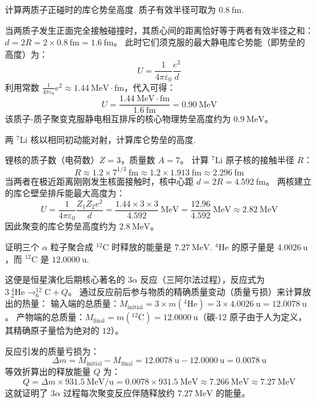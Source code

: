 \begin{exercise}\label{ex:29.32}
计算两质子正碰时的库仑势垒高度. 质子有效半径可取为 $0.8 \ \mathrm{fm}$.
\end{exercise}
\begin{solution}
当两质子发生正面完全接触碰撞时，其质心间的距离恰好等于两者有效半径之和：$d = 2 R = 2 \times 0.8 \ \mathrm{fm} = 1.6 \ \mathrm{fm}$。
此时它们须克服的最大静电库仑势能（即势垒的高度）为：
$$ U = \frac{1}{4\pi\varepsilon_0} \frac{e^2}{d} $$
利用常数 $\frac{1}{4\pi\varepsilon_0} e^2 \approx 1.44 \ \mathrm{MeV \cdot fm}$，代入可得：
$$ U = \frac{1.44 \ \mathrm{MeV \cdot fm}}{1.6 \ \mathrm{fm}} = 0.90 \ \mathrm{MeV} $$
该质子-质子聚变克服静电相互排斥的核心物理势垒高度约为 $0.9 \ \mathrm{MeV}$。
\end{solution}

\begin{exercise}\label{ex:29.33}
两 $^7\mathrm{Li}$ 核以相同初动能对射，计算库仑势垒的高度.
\end{exercise}
\begin{solution}
锂核的质子数（电荷数）$Z = 3$，质量数 $A = 7$。
计算 $^7\mathrm{Li}$ 原子核的接触半径 $R$：
$$ R \approx 1.2 \times 7^{1/3} \ \mathrm{fm} \approx 1.2 \times 1.913 \ \mathrm{fm} \approx 2.296 \ \mathrm{fm} $$
当两者在极近距离刚刚发生核面接触时，核中心距 $d = 2R = 4.592 \ \mathrm{fm}$。
两核建立的库仑壁垒排斥能最大高度为：
$$ U = \frac{1}{4\pi\varepsilon_0} \frac{Z_1 Z_2 e^2}{d} = \frac{1.44 \times 3 \times 3}{4.592} \ \mathrm{MeV} = \frac{12.96}{4.592} \ \mathrm{MeV} \approx 2.82 \ \mathrm{MeV} $$
因此聚变的库仑势垒高度约为 $2.8 \ \mathrm{MeV}$。
\end{solution}

\begin{exercise}\label{ex:29.34}
证明三个 $\alpha$ 粒子聚合成 $^{12}\mathrm{C}$ 时释放的能量是 $7.27 \ \mathrm{MeV}$. $^4\mathrm{He}$ 的原子量是 $4.0026 \ \mathrm{u}$，而 $^{12}\mathrm{C}$ 是 $12.0000 \ \mathrm{u}$.
\end{exercise}
\begin{solution}
这便是恒星演化后期核心著名的 3$\alpha$ 反应（三阿尔法过程），反应式为 $3 \ ^4_2\mathrm{He} \rightarrow ^{12}_6\mathrm{C} + Q$。
通过反应前后参与物质的精确质量变动（质量亏损）来计算放出的热量：
输入端的总质量：$M_{\text{initial}} = 3 \times m(^4\mathrm{He}) = 3 \times 4.0026 \ \mathrm{u} = 12.0078 \ \mathrm{u}$。
产物端的总质量：$M_{\text{final}} = m(^{12}\mathrm{C}) = 12.0000 \ \mathrm{u}$（碳-12 原子由于人为定义，其精确原子量恰为绝对的 $12$）。

反应引发的质量亏损为：
$$ \Delta m = M_{\text{initial}} - M_{\text{final}} = 12.0078 \ \mathrm{u} - 12.0000 \ \mathrm{u} = 0.0078 \ \mathrm{u} $$
等效折算出的释放能量 $Q$ 为：
$$ Q = \Delta m \times 931.5 \ \mathrm{MeV/u} = 0.0078 \times 931.5 \ \mathrm{MeV} \approx 7.266 \ \mathrm{MeV} \approx 7.27 \ \mathrm{MeV} $$
这就证明了 3$\alpha$ 过程每次聚变反应伴随释放约 $7.27 \ \mathrm{MeV}$ 的能量。
\end{solution}


